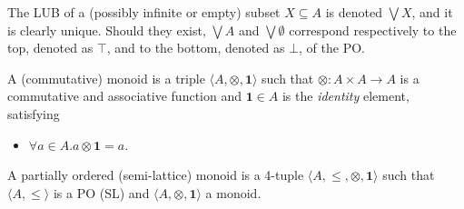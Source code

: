 \documentclass{llncs}
\def\monid{{\mathbf 0}}
\def\monop{\otimes}
\def\monid{\mathbf{1}}
\begin{document}
The LUB of a (possibly infinite or empty) subset $X \subseteq A$ is denoted $\bigvee X$, and it is clearly unique.
Should  they exist, $\bigvee A$ and $\bigvee \emptyset$ correspond respectively to the top, denoted as 
$\top$, and to the bottom, denoted as $\bot$, of the PO.
%

%



%
%

\begin{definition}[monoids]
	A (commutative) monoid is a triple
	$\langle A, \monop, \monid \rangle$ such that $\monop: A \times A \rightarrow A$ is
	a commutative and associative function and $\monid \in A$ is the \emph{identity} element,
	satisfying 
	\begin{itemize}
		\item $\forall a \in A. a \monop \monid = a$. %
	\end{itemize}
	A partially ordered (semi-lattice) monoid is a 4-tuple
	$\langle A, \leq, \monop, \monid \rangle$ such that 	
	$\langle A, \leq \rangle$ is a PO (SL) and $\langle A, \monop, \monid \rangle$ a monoid.
	
\end{definition}
\end{document}

